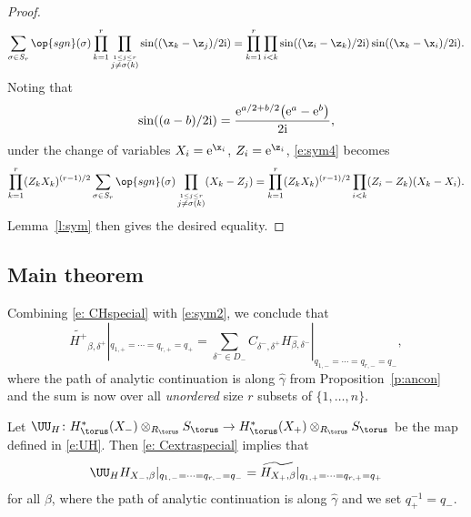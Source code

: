 \begin{proof}
\begin{align}
\sum_{\sigma \in S_r} \op{sgn}(\sigma) \prod_{k=1}^r \prod_{\stackrel{1 \leq j \leq r}{j\neq {\sigma(k)}}} \sin( ( \x_{k}- \z_j)/2 {\rm i})
= \prod_{k=1}^r \prod_{i<k} \sin(( \z_{i}- \z_{k})/2 {\rm i}) \sin((\x_{k} - \x_{i})/2{\rm i}).
\label{e:sym4}
\end{align}
Noting that
\[
\sin((a-b)/2{\rm i}) = \frac{ {\rm e}^{a/2 + b/2}\bigl( {\rm e}^a - {\rm e}^b\bigr)}{2{\rm i}},
\]
under the change of variables $X_i = {\rm e}^{\x_i}$, $Z_i = {\rm e}^{\z_i}$, \eqref{e:sym4} becomes
\begin{align*}
\prod_{k=1}^r (Z_k X_k)^{(r-1)/2}\sum_{\sigma \in S_r} \op{sgn}(\sigma) \prod_{\stackrel{1 \leq j \leq r}{j\neq {\sigma(k)}}} (X_k - Z_j)
= \prod_{k=1}^r (Z_k X_k)^{(r-1)/2}\prod_{i<k} (Z_i - Z_k) (X_k - X_i).
\end{align*}
Lemma~\ref{l:sym} then gives the desired equality.
\end{proof}


\subsection{Main theorem}

Combining \eqref{e: CHspecial} with \eqref{e:sym2}, we conclude that
\begin{equation}\label{e: Cextraspecial} \widetilde{H^{+}}_{\beta, \delta^+}|_{q_{1, +} = \cdots =q_{r, +} = q_+} = \sum_{\delta^- \in D_-} C_{\delta^-, \delta^+} H^{-}_{\beta, \delta^-}|_{q_{1, -} = \cdots = q_{r, -} = q_-},\end{equation}
where the path of analytic continuation is along $\hat \gamma$ from Proposition~\ref{p:ancon} and the sum is now over all \emph{unordered} size $r$ subsets of $\{1, \dots, n\}$.

Let $\UU_H\colon H^*_\torus(X_{-})\otimes_{R_\torus} S_\torus \to H^*_\torus(X_{+})\otimes_{R_\torus} S_\torus$ be the map defined in \eqref{e:UH}.
Then \eqref{e: Cextraspecial} implies that
\begin{equation}\label{e:ms}\UU_H H_{X_{-}, \beta}|_{q_{1, -} = \cdots =q_{r, -} = q_-} = \widetilde{H_{X_{+}, \beta}}|_{q_{1, +} = \cdots =q_{r, +} = q_+} \end{equation}
for all $\beta$, where the path of analytic continuation is along $\hat \gamma$ and we set $q_+^{-1} = q_-$.

